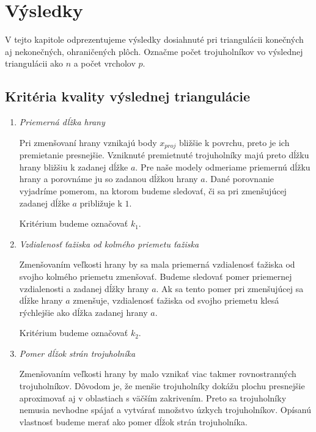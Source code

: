 \renewcommand{\arraystretch}{1}
\setlength{\fboxsep}{2mm} %
\setlength{\tabcolsep}{-4pt}

\chapter{Výsledky}
\label{kap:results}

V tejto kapitole odprezentujeme výsledky dosiahnuté pri triangulácii konečných aj 
nekonečných, ohraničených plôch. Označme počet trojuholníkov vo výslednej triangulácii 
ako $n$ a počet vrcholov $p$.

\section{Kritéria kvality výslednej triangulácie}
\begin{enumerate}
\item{
    \textit{Priemerná dĺžka hrany}

    Pri zmenšovaní hrany vznikajú body $x_{proj}$ bližšie k povrchu, preto je ich premietanie
    presnejšie. Vzniknuté premietnuté trojuholníky majú preto dĺžku hrany bližšiu k zadanej dĺžke 
    $a$. Pre naše modely odmeriame priemernú dĺžku hrany a porovnáme ju so zadanou dĺžkou hrany $a$. 
    Dané porovnanie vyjadríme 
    pomerom, na ktorom budeme sledovať, či sa pri zmenšujúcej zadanej dĺžke $a$ približuje k $1$.

    Kritérium budeme označovať $k_1$.
}
\item{
    \textit{Vzdialenosť ťažiska od kolmého priemetu ťažiska}

    Zmenšovaním veľkosti hrany by sa mala priemerná vzdialenosť ťažiska od svojho kolmého 
    priemetu zmenšovať. Budeme sledovať pomer priemernej 
    vzdialenosti a zadanej dĺžky hrany $a$. Ak sa tento pomer pri zmenšujúcej sa dĺžke hrany 
    $a$ zmenšuje, vzdialenosť
    ťažiska od svojho priemetu klesá rýchlejšie ako dĺžka zadanej hrany $a$.

    Kritérium budeme označovať $k_2$.
}
\item{
    \textit{Pomer dĺžok strán trojuholníka}

    Zmenšovaním veľkosti hrany by malo vznikať viac takmer rovnostranných trojuholníkov.
    Dôvodom je, že menšie trojuholníky dokážu plochu presnejšie aproximovať aj v oblastiach 
    s väčším zakrivením. Preto sa trojuholníky nemusia nevhodne spájať a vytvárať množstvo 
    úzkych trojuholníkov. Opísanú vlastnosť budeme merať ako pomer dĺžok strán trojuholníka. 

}
\end{enumerate}
